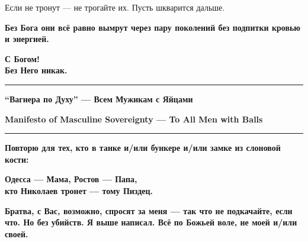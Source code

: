 \documentclass[11pt,a4paper]{article}
\theoremstyle{definition}
\theoremstyle{remark}
\begin{document}
\begin{tcolorbox}
{Если не тронут — не трогайте их. Пусть шкварится дальше.

\textbf{Без Бога они всё равно вымрут через пару поколений без подпитки кровью 
и энергией.}

\vspace{0.5cm}

\begin{center}
\Large
\textbf{С Богом!}\\[0.2cm]
\textbf{Без Него никак.}
\end{center}

} %

\end{tcolorbox}

\vspace{1cm}

\begin{center}

\rule{0.8\textwidth}{2pt}

\vspace{0.5cm}

{\Large\foreignlanguage{russian}{\textbf{``Вагнера по Духу'' — Всем Мужикам с Яйцами}}}

\vspace{0.3cm}

{\large\textbf{Manifesto of Masculine Sovereignty — To All Men with Balls}}

\vspace{0.5cm}

\rule{0.8\textwidth}{2pt}

\vspace{1cm}

\begin{tcolorbox}[colback=gray!10!white, colframe=black, width=0.9\textwidth]

\centering

\foreignlanguage{russian}{
\textbf{Повторю для тех, кто в танке и/или бункере и/или замке из слоновой кости:}
}

\vspace{0.3cm}

\foreignlanguage{russian}{
\Large
\textbf{Одесса — Мама, Ростов — Папа,\\
кто Николаев тронет — тому Пиздец.}
}

\vspace{0.5cm}

\foreignlanguage{russian}{
\textbf{Братва, с Вас, возможно, спросят за меня — так что не подкачайте, 
если что. Но без убийств. Я выше написал. Всё по Божьей воле, не моей и/или своей.}
}


\end{tcolorbox}
\end{center}
\end{document}

